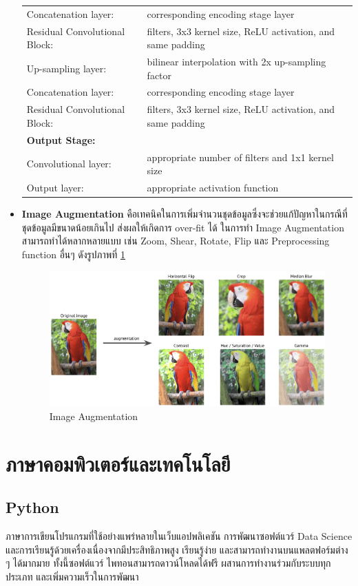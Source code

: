 \documentclass[12pt,oneside,openright,a4paper]{cpe-thai-project}
\begin{document}
\begin{itemize}
\begin{table}[!h]
\begin{tabular}{p{}>{\raggedright\arraybackslash}p{}}
\quad Concatenation layer: &  corresponding encoding stage layer \\
\quad Residual Convolutional Block: &  128 filters, 3x3 kernel size, ReLU activation, and same padding \\
\quad Up-sampling layer: &  bilinear interpolation with 2x up-sampling factor \\
\quad Concatenation layer: &  corresponding encoding stage layer \\
\quad Residual Convolutional Block: &  64 filters, 3x3 kernel size, ReLU activation, and same padding \\
\textbf{Output Stage:} & \\
\quad Convolutional layer: &  appropriate number of filters and 1x1 kernel size \\
\quad Output layer: &  appropriate activation function \\
\hline
\end{tabular}
\end{table}
\item\textbf{Image Augmentation} คือเทคนิคในการเพิ่มจำนวนชุดข้อมูลซึ่งจะช่วยแก้ปัญหาในกรณีที่ชุดข้อมูลมีขนาดน้อยเกินไป ส่งผลให้เกิดการ over-fit ได้ ในการทำ Image Augmentation สามารถทำได้หลากหลายแบบ เช่น Zoom, Shear, Rotate, Flip และ Preprocessing function อื่นๆ ดังรูปภาพที่ \ref{fig:imgaug}
\begin{figure}[!h]
    \centering
    \includegraphics[scale=0.05]{images/augmentation.jpg}
    \caption[Image Augmentation]{Image Augmentation \cite{img_augment}}
    \label{fig:imgaug}
\end{figure}
\end{itemize}
\pagebreak
\section{ภาษาคอมพิวเตอร์และเทคโนโลยี}
\subsection{Python}
ภาษาการเขียนโปรแกรมที่ใช้อย่างแพร่หลายในเว็บแอปพลิเคชัน การพัฒนาซอฟต์แวร์ Data Science และการเรียนรู้ด้วยเครื่องเนื่องจากมีประสิทธิภาพสูง เรียนรู้ง่าย และสามารถทำงานบนแพลตฟอร์มต่าง ๆ ได้มากมาย ทั้งนี้ซอฟต์แวร์ ไพทอนสามารถดาวน์โหลดได้ฟรี ผสานการทำงานร่วมกับระบบทุกประเภท และเพิ่มความเร็วในการพัฒนา \cite{25}
\end{document}
